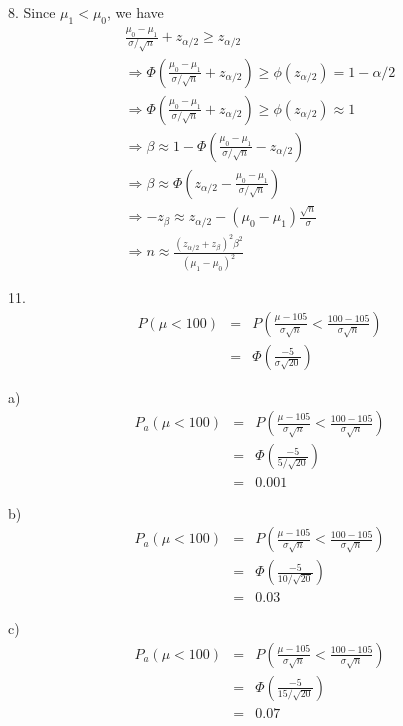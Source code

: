\documentclass[12pt]{article}
\begin{document}
8. Since $\mu_1 < \mu_0$, we have
\begin{eqnarray*}
  \frac {\mu_0 - \mu_1}{\sigma / \sqrt{n}} + z_{\alpha/2} \ge z_{\alpha/2} \\
  \Rightarrow \Phi \left( \frac {\mu_0 - \mu_1}{\sigma / \sqrt{n}}
    + z_{\alpha/2} \right) \ge \phi(z_{\alpha/2}) = 1 - \alpha / 2 \\
  \Rightarrow \Phi \left( \frac {\mu_0 - \mu_1}{\sigma / \sqrt{n}}
    + z_{\alpha/2} \right) \ge \phi(z_{\alpha/2}) \approx 1 \\
  \Rightarrow \beta \approx 1 - \Phi \left( \frac {\mu_0 - \mu_1}
    {\sigma / \sqrt{n}} - z_{\alpha/2} \right) \\
  \Rightarrow \beta \approx \Phi \left( z_{\alpha/2} - 
    \frac {\mu_0 - \mu_1}{\sigma / \sqrt{n}} \right) \\
  \Rightarrow -z_{\beta} \approx z_{\alpha/2} -
  (\mu_0 - \mu_1) \frac {\sqrt{n}}{\sigma} \\
  \Rightarrow n \approx \frac {(z_{\alpha/2} + z_{\beta})^2 \beta^2}
  {(\mu_1 - \mu_0)^2}
\end{eqnarray*}

11.
\begin{eqnarray*}
  P \left( \mu < 100 \right)
  &=& P \left( \frac {\mu - 105}{\sigma \sqrt{n}}
    < \frac {100 - 105}{\sigma \sqrt{n}} \right) \\
  &=& \Phi(\frac {-5}{\sigma \sqrt{20}})
\end{eqnarray*}

a)
\begin{eqnarray*}
  P_a \left( \mu < 100 \right)
  &=& P \left( \frac {\mu - 105}{\sigma \sqrt{n}}
    < \frac {100 - 105}{\sigma \sqrt{n}} \right) \\
  &=& \Phi(\frac {-5}{5 / \sqrt{20}}) \\
  &=& 0.001
\end{eqnarray*}

b)
\begin{eqnarray*}
  P_a \left( \mu < 100 \right)
  &=& P \left( \frac {\mu - 105}{\sigma \sqrt{n}}
    < \frac {100 - 105}{\sigma \sqrt{n}} \right) \\
  &=& \Phi(\frac {-5}{10 / \sqrt{20}}) \\
  &=& 0.03
\end{eqnarray*}

c)
\begin{eqnarray*}
  P_a \left( \mu < 100 \right)
  &=& P \left( \frac {\mu - 105}{\sigma \sqrt{n}}
    < \frac {100 - 105}{\sigma \sqrt{n}} \right) \\
  &=& \Phi(\frac {-5}{15 / \sqrt{20}}) \\
  &=& 0.07
\end{eqnarray*}
\end{document}

